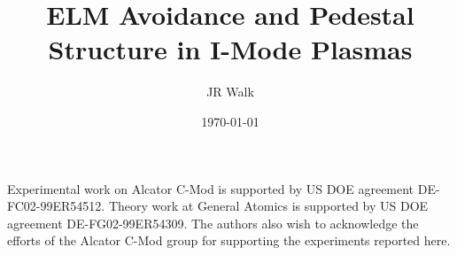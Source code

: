 \documentclass[12pt,floatfix,showpacs]{revtex4-1}
\begin{document}
\title{ELM Avoidance and Pedestal Structure in I-Mode Plasmas}

\author{JR Walk}



\date{\today}

\begin{abstract}

\end{abstract}


\maketitle



\begin{acknowledgments}
 Experimental work on Alcator C-Mod is supported by US DOE agreement DE-FC02-99ER54512. Theory work at General Atomics is supported by US DOE agreement DE-FG02-99ER54309.  The authors also wish to acknowledge the efforts of the Alcator C-Mod group for supporting the experiments reported here.
\end{acknowledgments}

% 
% 
\end{document}
